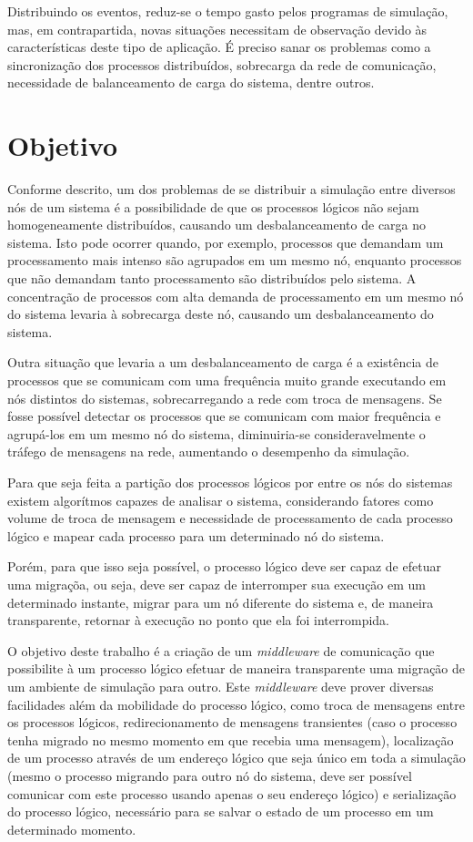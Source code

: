 Distribuindo os eventos, reduz-se o tempo gasto pelos programas de simulação, mas, em contrapartida, novas situações necessitam de observação devido às características deste tipo de aplicação. É preciso sanar os problemas como a sincronização dos processos distribuídos, sobrecarga da rede de comunicação, necessidade de balanceamento de carga do sistema, dentre outros.

\section{Objetivo}

Conforme descrito, um dos problemas de se distribuir a simulação entre diversos nós de um sistema é a possibilidade de que os processos lógicos não sejam homogeneamente distribuídos, causando um desbalanceamento de carga no sistema. Isto pode ocorrer quando, por exemplo, processos que demandam um processamento mais intenso são agrupados em um mesmo nó, enquanto processos que não demandam tanto processamento são distribuídos pelo sistema. A concentração de processos com alta demanda de processamento em um mesmo nó do sistema levaria à sobrecarga deste nó, causando um desbalanceamento do sistema.

Outra situação que levaria a um desbalanceamento de carga é a existência de processos que se comunicam com uma frequência muito grande executando em nós distintos do sistemas, sobrecarregando a rede com troca de mensagens. Se fosse possível detectar os processos que se comunicam com maior frequência e agrupá-los em um mesmo nó do sistema, diminuiria-se consideravelmente o tráfego de mensagens na rede, aumentando o desempenho da simulação.

Para que seja feita a partição dos processos lógicos por entre os nós do sistemas existem algorítmos capazes de analisar o sistema, considerando fatores como volume de troca de mensagem e necessidade de processamento de cada processo lógico e mapear cada processo para um determinado nó do sistema.

Porém, para que isso seja possível, o processo lógico deve ser capaz de efetuar uma migraçõa, ou seja, deve ser capaz de interromper sua execução em um determinado instante, migrar para um nó diferente do sistema e, de maneira transparente, retornar à execução no ponto que ela foi interrompida.

O objetivo deste trabalho é a criação de um \textit{middleware} de comunicação que possibilite à um processo lógico efetuar de maneira transparente uma migração de um ambiente de simulação para outro. Este \textit{middleware} deve prover diversas facilidades além da mobilidade do processo lógico, como troca de mensagens entre os processos lógicos, redirecionamento de mensagens transientes (caso o processo tenha migrado no mesmo momento em que recebia uma mensagem), localização de um processo através de um endereço lógico que seja único em toda a simulação (mesmo o processo migrando para outro nó do sistema, deve ser possível comunicar com este processo usando apenas o seu endereço lógico) e serialização do processo lógico, necessário para se salvar o estado de um processo em um determinado momento.

